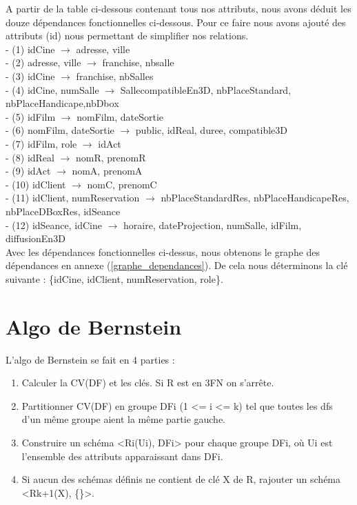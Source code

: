 \documentclass[a4paper,sffamily,12pt]{article}
\begin{document}
		\vspace{0.5cm}
	
		A partir de la table ci-dessous contenant tous nos attributs, nous avons déduit les douze dépendances fonctionnelles ci-dessous. Pour ce faire nous avons ajouté des attributs (id) nous permettant de simplifier nos relations.\\
	
		\noindent- (1) idCine $\rightarrow$ adresse, ville \\
		- (2) adresse, ville $\rightarrow$ franchise, nbsalle \\
		- (3) idCine $\rightarrow$ franchise, nbSalles \\
		- (4) idCine, numSalle $\rightarrow$ SallecompatibleEn3D, nbPlaceStandard, nbPlaceHandicape,nbDbox \\
 		- (5) idFilm $\rightarrow$ nomFilm, dateSortie \\
		- (6) nomFilm, dateSortie $\rightarrow$ public, idReal, duree, compatible3D \\
		- (7) idFilm, role $\rightarrow$  idAct \\
		- (8) idReal $\rightarrow$ nomR, prenomR \\
		- (9) idAct $\rightarrow$ nomA, prenomA \\
		- (10) idClient $\rightarrow$ nomC, prenomC \\
		- (11) idClient, numReservation $\rightarrow$ nbPlaceStandardRes, nbPlaceHandicapeRes, nbPlaceDBoxRes, idSeance \\
		- (12) idSeance, idCine $\rightarrow$ horaire, dateProjection, numSalle, idFilm, diffusionEn3D \\
		
		Avec les dépendances fonctionnelles ci-dessus, nous obtenons le graphe des dépendances en annexe (\ref{graphe_dependances}). De cela nous déterminons la clé suivante : \{idCine, idClient, numReservation, role\}.
		
	\section{Algo de Bernstein}
	
		\vspace{0.5cm}

		\noindent L'algo de Bernstein se fait en 4 parties :
	
			\begin{enumerate}[label=\ding{228}]
				\item Calculer la CV(DF) et les clés. Si R est en 3FN on s'arrête. 
				\item Partitionner CV(DF) en groupe DFi (1 <= i <= k) tel que toutes les dfs d'un même groupe aient la même partie gauche. 
				\item Construire un schéma <Ri(Ui), DFi> pour chaque groupe DFi, où Ui est l'ensemble des attributs apparaissant dans DFi.
				\item Si aucun des schémas définis ne contient de clé X de R, rajouter un schéma <Rk+1(X), \{\}>.
			\end{enumerate}	
			
\end{document}
